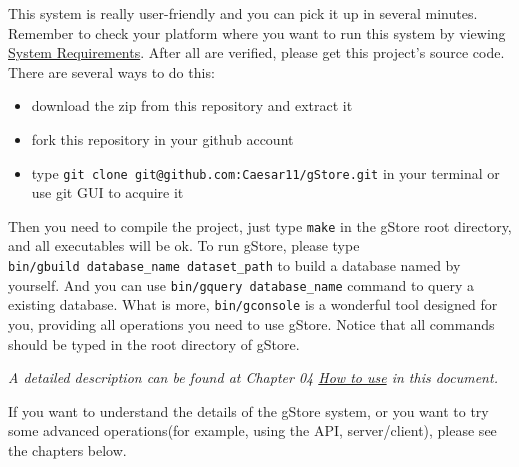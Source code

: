 \documentclass[titlepage, a4paper, 12pt]{article}
\begin{document}

This system is really user-friendly and you can pick it up in several minutes. Remember to check your platform where you want to run this system by viewing \hyperref[chapter01]{System Requirements}. After all are verified, please get this project's source code. There are several ways to do this:

\begin{itemize}
\item
  download the zip from this repository and extract it
\item
  fork this repository in your github account
\item
  type \texttt{git\ clone\ git@github.com:Caesar11/gStore.git} in your
  terminal or use git GUI to acquire it
\end{itemize}

Then you need to compile the project, just type \texttt{make} in the gStore root directory, and all executables will be ok. To run gStore, please type \texttt{bin/gbuild\ database\_name\ dataset\_path} to build a database named by yourself. And you can use \texttt{bin/gquery\ database\_name} command to query a existing database. What is more, \texttt{bin/gconsole} is a wonderful tool designed for you, providing all operations you need to use gStore.
Notice that all commands should be typed in the root directory of gStore.

\emph{A detailed description can be found at Chapter 04
\hyperref[chapter04]{How to use} in this document.}


If you want to understand the details of the gStore system, or you want to try some advanced operations(for example, using the API, server/client), please see the chapters below.
\end{document}
